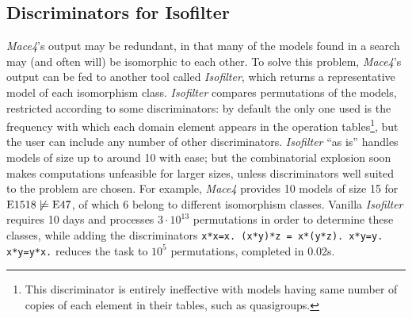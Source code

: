 \subsection{Discriminators for Isofilter}
\emph{Mace4}'s output may be redundant, in that many of the models found in a search may (and often will) be isomorphic to each other. To solve this problem, \emph{Mace4}'s output can be fed to another tool called \emph{Isofilter}, which returns a representative model of each isomorphism class. \emph{Isofilter} compares permutations of the models, restricted according to some discriminators: by default the only one used is the frequency with which each domain element appears in the operation tables\footnote{This discriminator is entirely ineffective with models having same number of copies of each element in their tables, such as quasigroups.}, but the user can include any number of other discriminators. \emph{Isofilter} ``as is'' handles models of size up to around 10 with ease; but the combinatorial explosion soon makes computations unfeasible for larger sizes, unless discriminators well suited to the problem are chosen. For example, \emph{Mace4} provides 10 models of size 15 for $\mathrm{E}1518 \not\models \mathrm{E}47$, of which $6$ belong to different isomorphism classes. Vanilla \emph{Isofilter} requires 10 days and processes $3\cdot10^{13}$ permutations in order to determine these classes, while adding the discriminators \verb|x*x=x. (x*y)*z = x*(y*z). x*y=y. x*y=y*x.| reduces the task to $10^5$ permutations, completed in 0.02s.
